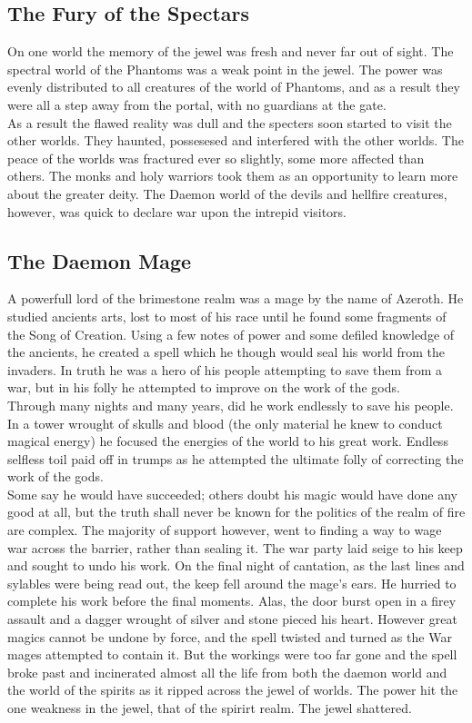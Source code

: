 \documentclass[a4paper,twocolumn]{article}
\begin{document}
\subsection{The Fury of the Spectars}

On one world the memory of the jewel was fresh and never far out of sight. The spectral world of the Phantoms was a weak point in the jewel. The power was evenly distributed to all creatures of the world of Phantoms, and as a result they were all a step away from the portal, with no guardians at the gate.\\
As a result the flawed reality was dull and the specters soon started to visit the other worlds. They haunted, possesesed and interfered with the other worlds. The peace of the worlds was fractured ever so slightly, some more affected than others. The monks and holy warriors took them as an opportunity to learn more about the greater deity. The Daemon world of the devils and hellfire creatures, however, was quick to declare war upon the intrepid visitors.

\subsection{The Daemon Mage}

A powerfull lord of the brimestone realm was a mage by the name of Azeroth. He studied ancients arts, lost to most of his race until he found some fragments of the Song of Creation. Using a few notes of power and some defiled knowledge of the ancients, he created a spell which he though would seal his world from the invaders. In truth he was a hero of his people attempting to save them from a war, but in his folly he attempted to improve on the work of the gods.\\
Through many nights and many years, did he work endlessly to save his people. In a tower wrought of skulls and blood (the only material he knew to conduct magical energy) he focused the energies of the world to his great work. Endless selfless toil paid off in trumps as he attempted the ultimate folly of correcting the work of the gods.\\
Some say he would have succeeded; others doubt his magic would have done any good at all, but the truth shall never be known for the politics of the realm of fire are complex. The majority of support however, went to finding a way to wage war across the barrier, rather than sealing it. The war party laid seige to his keep and sought to undo his work. On the final night of cantation, as the last lines and sylables were being read out, the keep fell around the mage's ears. He hurried to complete his work before the final moments. Alas, the door burst open in a firey assault and a dagger wrought of silver and stone pieced his heart. However great magics cannot be undone by force, and the spell twisted and turned as the War mages attempted to contain it. But the workings were too far gone and the spell broke past and incinerated almost all the life from both the daemon world and the world of the spirits as it ripped across the jewel of worlds. The power hit the one weakness in the jewel, that of the spirirt realm. The jewel shattered.
\end{document}
